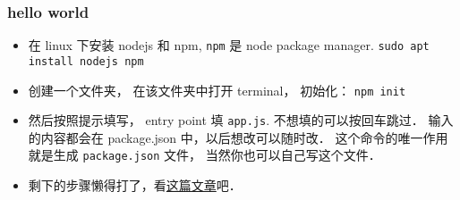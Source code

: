 
\begin{issues}
\issueDraft
\end{issues}

\subsubsection{hello world}
\begin{itemize}
\item 在 linux 下安装 nodejs 和 npm, \verb`npm` 是 node package manager. \verb|sudo apt install nodejs npm|
\item 创建一个文件夹， 在该文件夹中打开 terminal， 初始化： \verb|npm init|
\item 然后按照提示填写， entry point 填 \verb`app.js`. 不想填的可以按回车跳过． 输入的内容都会在 package.json 中，以后想改可以随时改． 这个命令的唯一作用就是生成 \verb`package.json` 文件， 当然你也可以自己写这个文件．
\item 剩下的步骤懒得打了，看\href{https://medium.com/@adnanrahic/hello-world-app-with-node-js-and-express-c1eb7cfa8a30}{这篇文章}吧．
\end{itemize}
